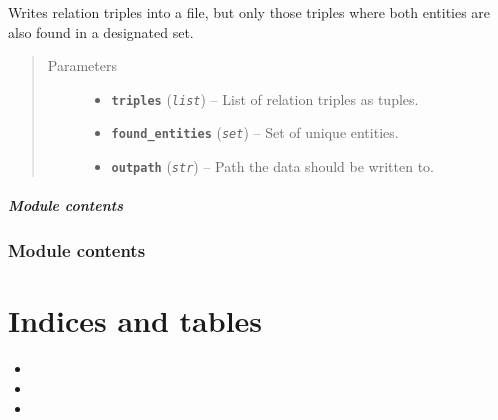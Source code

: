 \documentclass[letterpaper,10pt,english]{sphinxmanual}
\begin{document}
\begin{fulllineitems}
\label{src.trans_e:src.trans_e.trans_we.write_data}
Writes relation triples into a file, but only those triples where both entities are also found in a designated
set.
\begin{quote}\begin{description}
\item[{Parameters}] \leavevmode\begin{itemize}
\item {} 
\textbf{\texttt{triples}} (\emph{\texttt{list}}) -- List of relation triples as tuples.

\item {} 
\textbf{\texttt{found\_entities}} (\emph{\texttt{set}}) -- Set of unique entities.

\item {} 
\textbf{\texttt{outpath}} (\emph{\texttt{str}}) -- Path the data should be written to.

\end{itemize}

\end{description}\end{quote}

\end{fulllineitems}



\paragraph{Module contents}
\label{src.trans_e:module-src.trans_e}\label{src.trans_e:module-contents}

\subsection{Module contents}
\label{src:module-src}\label{src:module-contents}

\chapter{Indices and tables}
\label{index:indices-and-tables}\begin{itemize}
\item {} 

\item {} 

\item {} 

\end{itemize}
\end{document}
